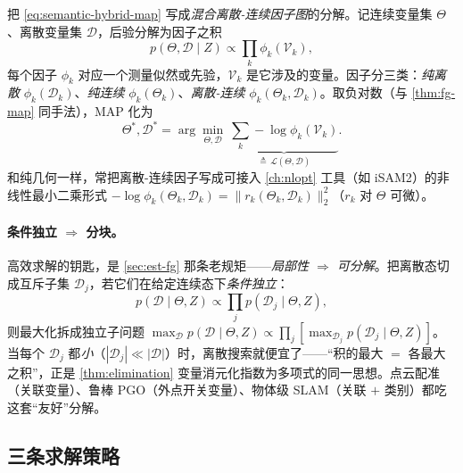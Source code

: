 把 \cref{eq:semantic-hybrid-map} 写成\emph{混合离散-连续因子图}的分解\cite{doherty2022discrete}。记连续变量集 $\Theta$、离散变量集 $\mathcal{D}$，后验分解为因子之积
\begin{equation}
  p(\Theta,\mathcal{D}\mid Z)\propto\prod_k\phi_k(\mathcal{V}_k),
  \label{eq:semantic-hybrid-factor}
\end{equation}
每个因子 $\phi_k$ 对应一个测量似然或先验，$\mathcal{V}_k$ 是它涉及的变量。因子分三类：\emph{纯离散} $\phi_k(\mathcal{D}_k)$、\emph{纯连续} $\phi_k(\Theta_k)$、\emph{离散-连续} $\phi_k(\Theta_k,\mathcal{D}_k)$。取负对数（与 \cref{thm:fg-map} 同手法），MAP 化为
\begin{equation}
  \Theta^{*},\mathcal{D}^{*}=\arg\min_{\Theta,\mathcal{D}}\ \underbrace{\sum_k-\log\phi_k(\mathcal{V}_k)}_{\triangleq\,\mathcal{L}(\Theta,\mathcal{D})}.
  \label{eq:semantic-hybrid-neglog}
\end{equation}
和纯几何一样，常把离散-连续因子写成可接入 \cref{ch:nlopt} 工具（如 iSAM2\cite{kaess2012isam2}）的非线性最小二乘形式 $-\log\phi_k(\Theta_k,\mathcal{D}_k)=\|r_k(\Theta_k,\mathcal{D}_k)\|_2^2$（$r_k$ 对 $\Theta$ 可微）\cite{doherty2022discrete}。

\paragraph{条件独立 $\Rightarrow$ 分块。}
高效求解的钥匙，是 \cref{sec:est-fg} 那条老规矩——\emph{局部性 $\Rightarrow$ 可分解}。把离散态切成互斥子集 $\mathcal{D}_j$，若它们在给定连续态下\emph{条件独立}：
\begin{equation}
  p(\mathcal{D}\mid\Theta,Z)\propto\prod_j p(\mathcal{D}_j\mid\Theta,Z),
  \label{eq:semantic-hybrid-condind}
\end{equation}
则最大化拆成独立子问题 $\max_{\mathcal{D}}p(\mathcal{D}\mid\Theta,Z)\propto\prod_j[\max_{\mathcal{D}_j}p(\mathcal{D}_j\mid\Theta,Z)]$\cite{doherty2022discrete}。当每个 $\mathcal{D}_j$ 都\emph{小}（$|\mathcal{D}_j|\ll|\mathcal{D}|$）时，离散搜索就便宜了——“积的最大 $=$ 各最大之积”，正是 \cref{thm:elimination} 变量消元化指数为多项式的同一思想。点云配准（关联变量）、鲁棒 PGO（外点开关变量）、物体级 SLAM（关联 $+$ 类别）都吃这套“友好”分解\cite{carlone2026handbook}。

\subsection{三条求解策略}
\label{sec:semantic-hybrid-solve}

